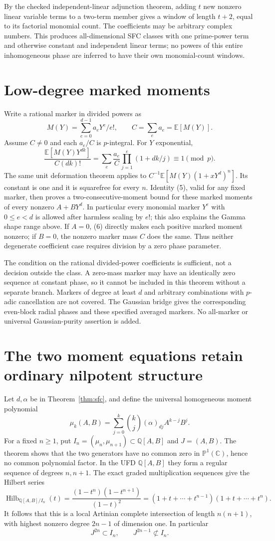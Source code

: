 \documentclass[11pt]{article}
\newcommand{\Q}{\mathbb Q}
\newcommand{\C}{\mathbb C}
\begin{document}
By the checked independent-linear adjunction theorem, adding $t$ new
nonzero linear variable terms to a two-term member gives a window of
length $t+2$, equal to its factorial monomial count. The coefficients may
be arbitrary complex numbers. This produces all-dimensional SFC classes
with one prime-power term and otherwise constant and independent linear
terms; no powers of this entire inhomogeneous phase are inferred to
have their own monomial-count windows.

\section{Low-degree marked moments}
Write a rational marker in divided powers as
\[
 M(Y)=\sum_{e=0}^{d-1}a_eY^e/e!,\qquad C=\sum_e a_e=\mathbb E[M(Y)].
\]
Assume $C\ne0$ and each $a_e/C$ is $p$-integral. For $Y$ exponential,
\[
 \frac{\mathbb E[M(Y)Y^{dk}]}{C(dk)!}
 =\sum_e\frac{a_e}{C}\prod_{j=1}^{e}(1+dk/j)
 \equiv1\pmod p.                                  \tag{6}
\]
The same unit deformation theorem applies to
$C^{-1}\mathbb E[M(Y)(1+xY^d)^n]$. Its constant is one and it is
squarefree for every $n$. Identity (5), valid for any fixed marker,
then proves a two-consecutive-moment bound for these marked moments
of every nonzero $A+BY^d$. In particular every monomial marker $Y^e$
with $0\le e<d$ is allowed after harmless scaling by $e!$; this also
explains the Gamma shape range above.
If $A=0$, (6) directly makes each positive marked moment nonzero; if
$B=0$, the nonzero marker mass $C$ does the same. Thus neither degenerate
coefficient case requires division by a zero phase parameter.

The condition on the rational divided-power coefficients is sufficient,
not a decision outside the class. A zero-mass marker may have an
identically zero sequence at constant phase, so it cannot be included in
this theorem without a separate branch. Markers of degree at least $d$
and arbitrary combinations with $p$-adic cancellation are not covered.
The Gaussian bridge gives the corresponding even-block radial phases
and these specified averaged markers. No all-marker or universal
Gaussian-purity assertion is added.

\section{The two moment equations retain ordinary nilpotent structure}
Let $d,\alpha$ be in Theorem~\ref{thm:sfc}, and define the universal
homogeneous moment polynomial
\[
 \mu_k(A,B)=\sum_{j=0}^k\binom kj(\alpha)_{dj}A^{k-j}B^j.
\]
For a fixed $n\ge1$, put
$I_n=(\mu_n,\mu_{n+1})\subset\Q[A,B]$ and $J=(A,B)$.
The theorem shows that the two generators have no common zero in
$\mathbb P^1(\C)$, hence no common polynomial factor. In the UFD
$\Q[A,B]$ they form a regular sequence of degrees $n,n+1$.
The exact graded multiplication sequences give the Hilbert series
\[
 \operatorname{Hilb}_{\Q[A,B]/I_n}(t)
  =\frac{(1-t^n)(1-t^{n+1})}{(1-t)^2}
  =(1+t+\cdots+t^{n-1})(1+t+\cdots+t^n).          \tag{7}
\]
It follows that this is a local Artinian complete intersection of length
$n(n+1)$, with highest nonzero degree $2n-1$ of dimension one. In particular
\[
 J^{2n}\subset I_n,\qquad J^{2n-1}\not\subset I_n. \tag{8}
\]
\end{document}

